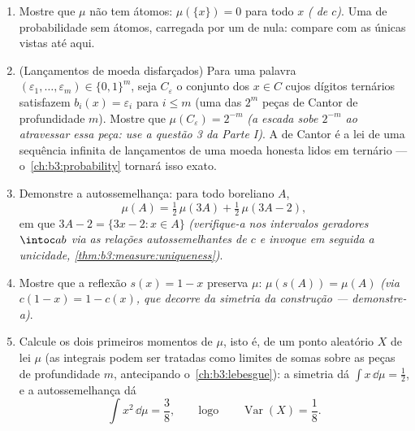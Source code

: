 \begin{problem}
\begin{enumerate}[resume]
        \[
        \mu(C) = 1, \qquad \lambda(C) = 0 :
        \]
        $\mu$ e $\lambda$ vivem em suportes disjuntos ($C$ e seu
        complementar). Duas  nessa situação são ditas
        \emph{mutuamente singulares}, o que se escreve $\mu \perp
        \lambda$.
  \item Mostre que $\mu$ não tem átomos: $\mu(\{x\}) = 0$ para todo $x$
        \emph{( de $c$)}. Uma  de probabilidade sem
        átomos, carregada por um  de  nula:
        compare com as únicas  vistas até aqui.
  \item (Lançamentos de moeda disfarçados) Para uma palavra $(\varepsilon_1,
        \dots, \varepsilon_m) \in \{0,1\}^m$, seja
        $C_{\varepsilon}$ o conjunto dos $x \in C$ cujos dígitos ternários satisfazem
        $b_i(x) = \varepsilon_i$ para $i \leq m$ (uma das $2^m$ peças de Cantor de
        profundidade $m$). Mostre que $\mu(C_\varepsilon) = 2^{-m}$ \emph{(a escada sobe
        $2^{-m}$ ao atravessar essa peça: use a questão 3 da Parte
        I)}. A  de Cantor é a lei de uma sequência infinita de
        lançamentos de uma moeda honesta lidos em ternário --- o~\cref{ch:b3:probability} tornará isso exato.
  \item Demonstre a autossemelhança: para todo boreliano $A$,
        \[
        \mu(A) = \tfrac12\,\mu(3A) +
        \tfrac12\,\mu(3A - 2) ,
        \]
        em que $3A - 2 = \{3x - 2 : x \in A\}$ \emph{(verifique-a nos intervalos geradores $\intoc ab$
        via as relações autossemelhantes de $c$ e invoque em seguida
        a unicidade, \cref{thm:b3:measure:uniqueness})}.
  \item Mostre que a reflexão $s(x) = 1 - x$ preserva $\mu$: $\mu(s(A)) = \mu(A)$ \emph{(via
        $c(1 - x) = 1 -
        c(x)$, que decorre da simetria da construção --- demonstre-a)}.
  \item Calcule os dois primeiros momentos de $\mu$, isto é, de um
        ponto aleatório $X$ de lei $\mu$ (as integrais podem ser
        tratadas como limites de somas sobre as peças de profundidade
        $m$, antecipando o~\cref{ch:b3:lebesgue}): a simetria dá $\int x\,\dd\mu = \frac12$, e a
        autossemelhança dá
        \[
        \int x^2\,\dd\mu = \frac38,
        \qquad\text{logo}\qquad
        \operatorname{Var}(X) = \frac18 .
\]
\end{enumerate}
\end{problem}
